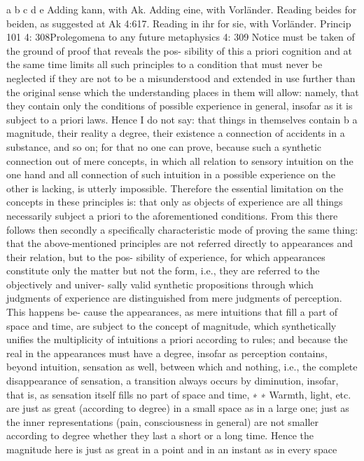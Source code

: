 a
b
c
d
e
Adding kann, with Ak.
Adding eine, with Vorländer.
Reading beides for beiden, as suggested at Ak 4:617.
Reading in ihr for sie, with Vorländer.
Princip
101
4: 308Prolegomena to any future metaphysics
4: 309
Notice must be taken of the ground of proof that reveals the pos-
sibility of this a priori cognition and at the same time limits all such
principles to a condition that must never be neglected if they are not to
be a misunderstood and extended in use further than the original sense
which the understanding places in them will allow: namely, that they
contain only the conditions of possible experience in general, insofar as
it is subject to a priori laws. Hence I do not say: that things in themselves
contain b a magnitude, their reality a degree, their existence a connection
of accidents in a substance, and so on; for that no one can prove, because
such a synthetic connection out of mere concepts, in which all relation
to sensory intuition on the one hand and all connection of such intuition
in a possible experience on the other is lacking, is utterly impossible.
Therefore the essential limitation on the concepts in these principles is:
that only as objects of experience are all things necessarily subject a priori
to the aforementioned conditions.
From this there follows then secondly a speciﬁcally characteristic
mode of proving the same thing: that the above-mentioned principles
are not referred directly to appearances and their relation, but to the pos-
sibility of experience, for which appearances constitute only the matter
but not the form, i.e., they are referred to the objectively and univer-
sally valid synthetic propositions through which judgments of experience
are distinguished from mere judgments of perception. This happens be-
cause the appearances, as mere intuitions that ﬁll a part of space and time,
are subject to the concept of magnitude, which synthetically uniﬁes the
multiplicity of intuitions a priori according to rules; and because the real
in the appearances must have a degree, insofar as perception contains,
beyond intuition, sensation as well, between which and nothing, i.e.,
the complete disappearance of sensation, a transition always occurs by
diminution, insofar, that is, as sensation itself ﬁlls no part of space and time, ∗
∗ Warmth, light, etc. are just as great (according to degree) in a small space as in a
large one; just as the inner representations (pain, consciousness in general) are
not smaller according to degree whether they last a short or a long time. Hence
the magnitude here is just as great in a point and in an instant as in every space
